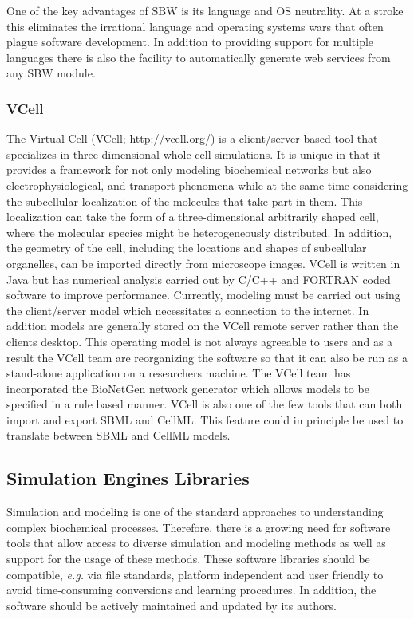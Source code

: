 One of the key advantages of SBW is its language and OS neutrality. At a
stroke this eliminates the irrational language and operating systems
wars that often plague software development. In addition to providing
support for multiple languages there is also the facility to
automatically generate web services from any SBW module.

\subsubsection{VCell}

The Virtual Cell (VCell; \url{http://vcell.org/}) \autocite{VCELL}
\autocite{moraru2008virtual} is a client/server based tool that
specializes in three-dimensional whole cell simulations. It is unique in
that it provides a framework for not only modeling biochemical networks
but also electrophysiological, and transport phenomena while at the same
time considering the subcellular localization of the molecules that take
part in them. This localization can take the form of a three-dimensional
arbitrarily shaped cell, where the molecular species might be
heterogeneously distributed. In addition, the geometry of the cell,
including the locations and shapes of subcellular organelles, can be
imported directly from microscope images. VCell is written in Java but
has numerical analysis carried out by C/C++ and FORTRAN coded software
to improve performance. Currently, modeling must be carried out using
the client/server model which necessitates a connection to the internet.
In addition models are generally stored on the VCell remote server
rather than the clients desktop. This operating model is not always
agreeable to users and as a result the VCell team are reorganizing the
software so that it can also be run as a stand-alone application on a
researchers machine. The VCell team has incorporated the BioNetGen
\autocite{blinov2004bionetgen} network generator which allows models to
be specified in a rule based manner. VCell is also one of the few tools
that can both import and export SBML and CellML. This feature could in
principle be used to translate between SBML and CellML models.

\subsection{Simulation Engines Libraries}

Simulation and modeling is one of the standard approaches to
understanding complex biochemical processes. Therefore, there is a
growing need for software tools that allow access to diverse simulation
and modeling methods as well as support for the usage of these methods.
These software libraries should be compatible, \emph{e.g.} via file
standards, platform independent and user friendly to avoid
time-consuming conversions and learning procedures. In addition, the
software should be actively maintained and updated by its authors.

